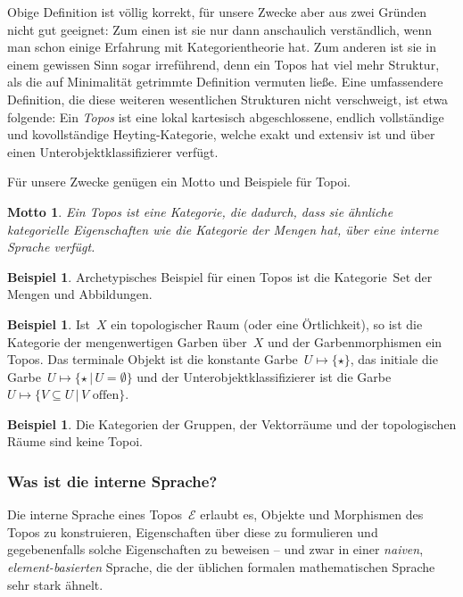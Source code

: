 \documentclass[a4paper,ngerman,12pt]{scrartcl}
\theoremstyle{definition}
\newtheorem{bsp}[defn]{Beispiel}
\theoremstyle{plain}
\newtheorem{motto}[defn]{Motto}
\theoremstyle{remark}
\newcommand{\E}{\mathcal{E}}
\newcommand{\Set}{\mathrm{Set}}
\renewcommand{\_}{\mathpunct{.}\,}
\newcommand{\?}{\,{:}\,}
\begin{document}
Obige Definition ist völlig korrekt, für unsere Zwecke aber aus zwei
Gründen nicht gut geeignet: Zum einen ist sie nur dann anschaulich
verständlich, wenn man schon einige Erfahrung mit Kategorientheorie hat. Zum
anderen ist sie in einem gewissen Sinn sogar irreführend, denn ein Topos hat
viel mehr Struktur, als die auf Minimalität getrimmte Definition vermuten ließe.
Eine umfassendere Definition, die diese weiteren wesentlichen Strukturen nicht
verschweigt, ist etwa folgende: Ein \emph{Topos} ist eine lokal kartesisch
abgeschlossene, endlich vollständige und kovollständige Heyting-Kategorie,
welche exakt und extensiv ist und über einen Unterobjektklassifizierer verfügt.

Für unsere Zwecke genügen ein Motto und Beispiele für Topoi.

\begin{motto}Ein Topos ist eine Kategorie, die dadurch, dass sie ähnliche
kategorielle Eigenschaften wie die Kategorie der Mengen hat, über eine
\emph{interne Sprache} verfügt.\end{motto}

\begin{bsp}Archetypisches Beispiel für einen Topos ist die Kategorie~$\Set$ der
Mengen und Abbildungen.
\end{bsp}

\begin{bsp}Ist~$X$ ein topologischer Raum (oder eine Örtlichkeit), so ist die
Kategorie der mengenwertigen Garben über~$X$ und der Garbenmorphismen ein
Topos. Das terminale Objekt ist die konstante Garbe~$U \mapsto \{ \star \}$,
das initiale die Garbe~$U \mapsto \{ \star \,|\, U = \emptyset \}$ und der
Unterobjektklassifizierer ist die Garbe~$U \mapsto \{ V \subseteq U \,|\,
\text{$V$ offen} \}$.
\end{bsp}

\begin{bsp}Die Kategorien der Gruppen, der Vektorräume und der topologischen Räume sind
keine Topoi.\end{bsp}


\subsubsection*{Was ist die interne Sprache?}

Die interne Sprache eines Topos~$\E$ erlaubt es,
Objekte und Morphismen des Topos zu konstruieren,
Eigenschaften über diese zu formulieren und
gegebenenfalls solche Eigenschaften zu beweisen --
und zwar in einer \emph{naiven}, \emph{element-basierten} Sprache, die der
üblichen formalen mathematischen Sprache sehr stark ähnelt.
\end{document}
